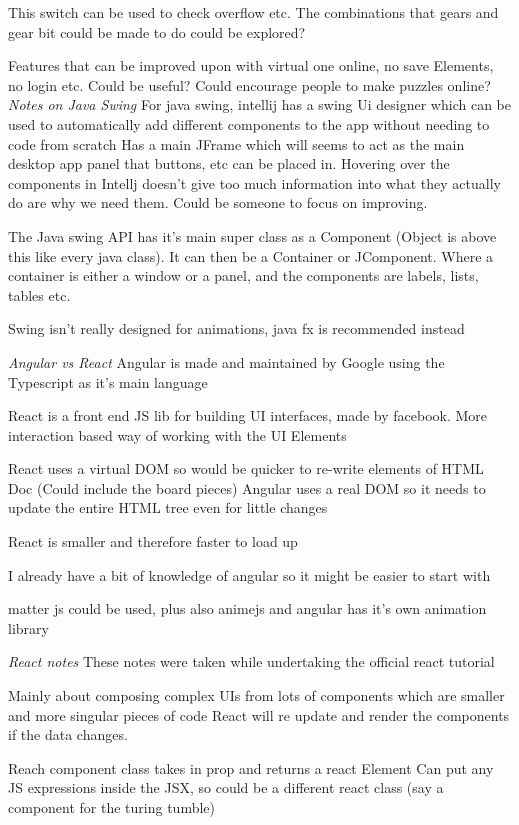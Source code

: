 \documentclass{l4proj}
\begin{document}
This switch can be used to check overflow etc. The combinations that gears and gear bit could be made to do could be explored?


Features that can be improved upon with virtual one online, no save Elements, no login etc. Could be useful? Could encourage people to make puzzles online? 
\emph{Notes on Java Swing}
For java swing, intellij has a swing Ui designer which can be used to automatically add different components to the app without needing to code from scratch
Has a main JFrame which will seems to act as the main desktop app panel that buttons, etc can be placed in. 
Hovering over the components in Intellj doesn't give too much information into what they actually do are why we need them. Could be someone to focus on improving.

The Java swing API has it's main super class as a Component (Object is above this like every java class). It can then be a Container or JComponent. Where a container is either a window or a panel, and the 
components are labels, lists, tables etc. 

Swing isn't really designed for animations, java fx is recommended instead


\emph{Angular vs React} 
Angular is made and maintained by Google using the Typescript as it's main language

React is a front end JS lib for building UI interfaces, made by facebook. More interaction based way of working with the UI Elements

React uses a virtual DOM so would be quicker to re-write elements of HTML Doc (Could include the board pieces)
Angular uses a real DOM so it needs to update the entire HTML tree even for little changes

React is smaller and therefore faster to load up

I already have a bit of knowledge of angular so it might be easier to start with

matter js could be used, plus also animejs and angular has it's own animation library

\emph{React notes}
These notes were taken while undertaking the official react tutorial

Mainly about composing complex UIs from lots of components which are smaller and more singular pieces of code
React will re update and render the components if the data changes.

Reach component class takes in prop and returns a react Element
Can put any JS expressions inside the JSX, so could be a different react class (say a component for the turing tumble)
\end{document}
